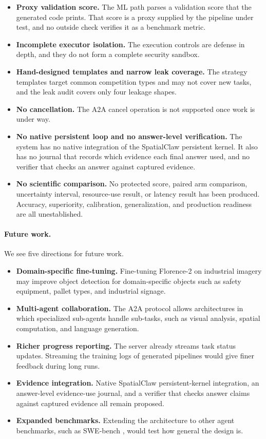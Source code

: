 \documentclass{article}
\begin{document}
\begin{itemize}[leftmargin=*,nosep,beginpenalty=10000]
  \item \textbf{Proxy validation score.} The ML path parses a validation score that the generated code prints. That score is a proxy supplied by the pipeline under test, and no outside check verifies it as a benchmark metric.
  \item \textbf{Incomplete executor isolation.} The execution controls are defense in depth, and they do not form a complete security sandbox.
  \item \textbf{Hand-designed templates and narrow leak coverage.} The strategy templates target common competition types and may not cover new tasks, and the leak audit covers only four leakage shapes.
  \item \textbf{No cancellation.} The A2A cancel operation is not supported once work is under way.
  \item \textbf{No native persistent loop and no answer-level verification.} The system has no native integration of the SpatialClaw persistent kernel. It also has no journal that records which evidence each final answer used, and no verifier that checks an answer against captured evidence.
  \item \textbf{No scientific comparison.} No protected score, paired arm comparison, uncertainty interval, resource-use result, or latency result has been produced. Accuracy, superiority, calibration, generalization, and production readiness are all unestablished.
\end{itemize}

\paragraph{Future work.}
We see five directions for future work.
\begin{itemize}[leftmargin=*,nosep]
  \item \textbf{Domain-specific fine-tuning.} Fine-tuning Florence-2 on industrial imagery may improve object detection for domain-specific objects such as safety equipment, pallet types, and industrial signage.
  \item \textbf{Multi-agent collaboration.} The A2A protocol allows architectures in which specialized sub-agents handle sub-tasks, such as visual analysis, spatial computation, and language generation.
  \item \textbf{Richer progress reporting.} The server already streams task status updates. Streaming the training logs of generated pipelines would give finer feedback during long runs.
  \item \textbf{Evidence integration.} Native SpatialClaw persistent-kernel integration, an answer-level evidence-use journal, and a verifier that checks answer claims against captured evidence all remain proposed.
  \item \textbf{Expanded benchmarks.} Extending the architecture to other agent benchmarks, such as SWE-bench \citep{jimenez2024swebench}, would test how general the design is.
\end{itemize}
\end{document}
